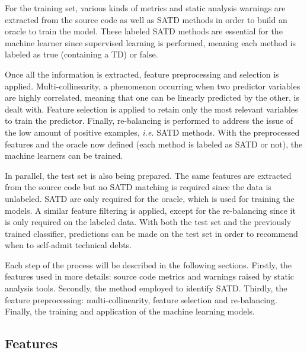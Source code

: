For the training set, various kinds of metrics and static analysis warnings are extracted from the source code as well as \ac{SATD} methods in order to build an oracle to train the model. These labeled \ac{SATD} methods are essential for the machine learner since supervised learning is performed, meaning each method is labeled as true (containing a TD) or false. \par 

Once all the information is extracted, feature preprocessing and selection is applied. Multi-collinearity, a phenomenon occurring when two predictor variables are highly correlated, meaning that one can be linearly predicted by the other, is dealt with. Feature selection is applied to retain only the most relevant variables to train the predictor. Finally, re-balancing is performed to address the issue of the low amount of positive examples, \textit{i.e.} \ac{SATD} methods. With the preprocessed features and the oracle now defined (each method is labeled as \ac{SATD} or not), the machine learners can be trained. \par 

In parallel, the test set is also being prepared. The same features are extracted from the source code but no \ac{SATD} matching is required since the data is unlabeled. \ac{SATD} are only required for the oracle, which is used for training the models. A similar feature filtering is applied, except for the re-balancing since it is only required on the labeled data. With both the test set and the previously trained classifier, predictions can be made on the test set in order to recommend when to self-admit technical debts. \par

Each step of the process will be described in the following sections. Firstly, the features used in more details: source code metrics and warnings raised by static analysis tools. Secondly, the method employed to identify \ac{SATD}. Thirdly, the feature preprocessing: multi-collinearity, feature selection and re-balancing. Finally, the training and application of the machine learning models.

\subsection{Features}


